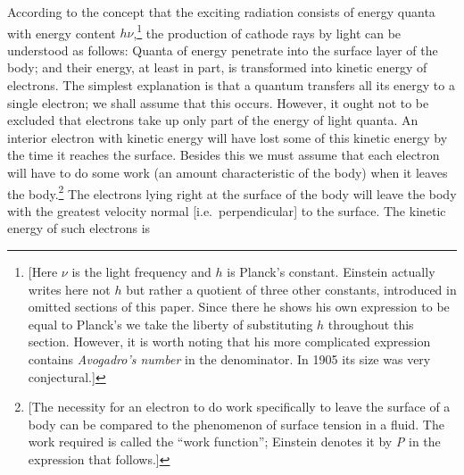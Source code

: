 According to the concept that the exciting radiation consists of energy
quanta with energy content $h\nu$,\footnote{\label{fn:einstein_h}{[}Here $\nu$ is the
  light frequency and $h$ is Planck's constant. Einstein actually
  writes here not $h$ but rather a quotient of three other
  constants, introduced in omitted sections of this paper. Since there
  he shows his own expression to be equal to Planck's we take the
  liberty of substituting $h$ throughout this section. However, it
  is worth noting that his more complicated expression contains
  \emph{Avogadro's number} in the denominator. In 1905 its size was very
  conjectural.{]}} the production of cathode rays by light can be
understood as follows: Quanta of energy penetrate into the surface layer
of the body; and their energy, at least in part, is transformed into
kinetic energy of electrons. The simplest explanation is that a quantum
transfers all its energy to a single electron; we shall assume that this
occurs. However, it ought not to be excluded that electrons take up only
part of the energy of light quanta. An interior electron with kinetic
energy will have lost some of this kinetic energy by the time it reaches
the surface. Besides this we must assume that each electron will have to
do some work (an amount characteristic of the body) when it leaves the
body.\footnote{{[}The necessity for an electron to do work specifically
  to leave the surface of a body can be compared to the phenomenon of
  surface tension in a fluid. The work required is called the ``work
  function''; Einstein denotes it by \emph{P} in the expression that
  follows.{]}} The electrons lying right at the surface of the body will
leave the body with the greatest velocity normal {[}i.e.\
perpendicular{]} to the surface. The kinetic energy of such electrons is

